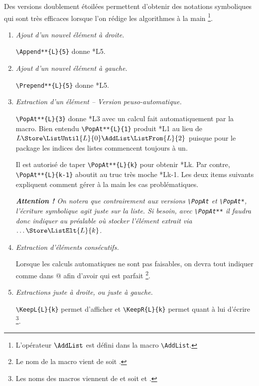 Des versions doublement étoilées permettent d'obtenir des notations symboliques qui sont très efficaces lorsque l'on rédige les algorithmes à la main
\footnote{
	L'opérateur $\AddList$ est défini dans la macro \texttt{\textbackslash{}AddList}.
}.

\begin{enumerate}
	\item \textit{Ajout d'un nouvel élément à droite.}

	      \verb+\Append**{L}{5}+ donne \Append**{L}{5}.


	\item \textit{Ajout d'un nouvel élément à gauche.}

	      \verb+\Prepend**{L}{5}+ donne \Prepend**{L}{5}.


	\item \textit{Extraction d'un élément -- Version peuso-automatique.}

	      \verb+\PopAt**{L}{3}+ donne \PopAt**{L}{3} avec un calcul fait automatiquement par la macro.
	      Bien entendu \verb+\PopAt**{L}{1}+ produit \PopAt**{L}{1} au lieu de $L \Store \ListUntil{L}{0} \AddList \ListFrom{L}{2}$ puisque pour le package les indices des listes commencent toujours à un.
	      
	      Il est autorisé de taper \verb+\PopAt**{L}{k}+ pour obtenir \PopAt**{L}{k}. Par contre, \verb+\PopAt**{L}{k-1}+ aboutit au truc très moche \PopAt**{L}{k-1}. 
	      Les deux items suivants expliquent comment gérer à la main les cas problématiques.

	      \smallskip

	      \emph{\textbf{Attention !} On notera que contrairement aux versions \emph{\texttt{\textbackslash{}PopAt}} et \emph{\texttt{\textbackslash{}PopAt*}}, l'écriture symbolique agit juste sur la liste. Si besoin, avec \emph{\texttt{\textbackslash{}PopAt**}} il faudra donc indiquer au préalable où stocker l'élément extrait via $\dots \Store \ListElt{L}{k}$.}


	\item \textit{Extraction d'éléments consécutifs.}

	      Lorsque les calculs automatiques ne sont pas faisables, on devra tout indiquer comme dans \verb@{}@ afin d'avoir  qui est parfait
	      \footnote{
	      	Le nom de la macro vient de  soit .
		  }.


	\item \textit{Extractions juste à droite, ou juste à gauche.}

	      \verb+\KeepL{L}{k}+ permet d'afficher  et \verb++ permet quant à lui d'écrire \KeepR{L}{k}
	      \footnote{
	      	Les noms des macros viennent de  et  soit  et .
		  }.
\end{enumerate}


